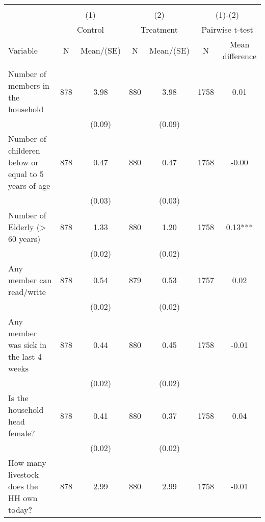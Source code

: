 
\begin{tabular}{@{\extracolsep{5pt}}lcccccc}
\\[-1.8ex]\hline \hline \\[-1.8ex]
 & \multicolumn{2}{c}{(1)}  & \multicolumn{2}{c}{(2)}  & \multicolumn{2}{c}{(1)-(2)} \\
 & \multicolumn{2}{c}{Control}  & \multicolumn{2}{c}{Treatment}  & \multicolumn{2}{c}{Pairwise t-test}  \\
Variable & N & Mean/(SE) & N & Mean/(SE) & N & Mean difference \\ \hline \\[-1.8ex] 
Number of members in the household   & 878    & 3.98    & 880    & 3.98    & 1758    & 0.01   \\
 &   & (0.09)  &   & (0.09)  &   &  \\ [1ex]
Number of childeren below or equal to 5 years of age   & 878    & 0.47    & 880    & 0.47    & 1758    & -0.00   \\
 &   & (0.03)  &   & (0.03)  &   &  \\ [1ex]
Number of Elderly (> 60 years)   & 878    & 1.33    & 880    & 1.20    & 1758    & 0.13***   \\
 &   & (0.02)  &   & (0.02)  &   &  \\ [1ex]
Any member can read/write   & 878    & 0.54    & 879    & 0.53    & 1757    & 0.02   \\
 &   & (0.02)  &   & (0.02)  &   &  \\ [1ex]
Any member was sick in the last 4 weeks   & 878    & 0.44    & 880    & 0.45    & 1758    & -0.01   \\
 &   & (0.02)  &   & (0.02)  &   &  \\ [1ex]
Is the household head female?   & 878    & 0.41    & 880    & 0.37    & 1758    & 0.04   \\
 &   & (0.02)  &   & (0.02)  &   &  \\ [1ex]
How many livestock does the HH own today?   & 878    & 2.99    & 880    & 2.99    & 1758    & -0.01   \\

\end{tabular}
